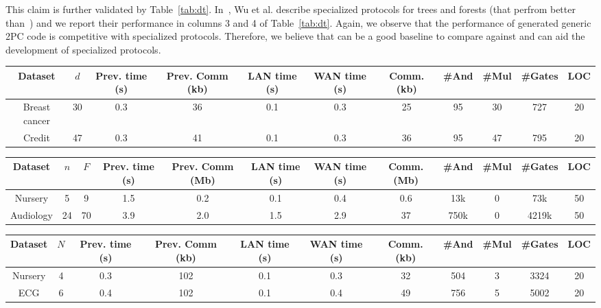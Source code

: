 This claim is further validated by Table~\ref{tab:dt}.
In~\cite{wu}, Wu et al. describe specialized protocols for trees and forests (that perfrom better than~\cite{shafindss}) and we report their performance in columns 3 and 4 of Table~\ref{tab:dt}.
Again, we observe that the performance of \tool generated generic 2PC code is competitive with specialized protocols. Therefore, we believe that \tool can be a good baseline to compare against and can aid the development of specialized protocols.

\begin{table*}[ht]
\begin{tabular}{c|c|c|c|c |c|c|c|c|c|c}
Dataset & $d$  & Prev. time (s) & Prev. Comm (kb) & LAN time (s) & WAN time (s) & Comm. (kb)  & \#And & \#Mul & \#Gates & LOC\\
\hline
Breast cancer & 30 & 0.3 & 36 & 0.1 & 0.3 & 25 & 95 & 30 & 727 & 20\\
\hline
Credit & 47 & 0.3 & 41 & 0.1 & 0.3 & 36 & 95 & 47 & 795 & 20\\
\hline
\end{tabular}

 \caption{Linear classification results}
 \label{tab:lc} 
\end{table*}

\begin{table*}[ht]
\begin{tabular}{c|c|c|c|c|c |c|c|c|c|c|c}
Dataset & $n$ & $F$ & Prev. time (s) & Prev. Comm (Mb) & LAN time (s) & WAN time (s) & Comm. (Mb)  & \#And & \#Mul & \#Gates  & LOC\\
\hline
Nursery & 5 & 9 & 1.5 & 0.2 & 0.1 & 0.4 & 0.6 & 13k & 0 & 73k & 50\\
\hline
Audiology & 24 & 70 & 3.9 & 2.0 & 1.5 & 2.9 & 37 & 750k & 0 & 4219k & 50\\
\hline
\end{tabular}

 \caption{Naive Bayes results}
 \label{tab:nb} 
\end{table*}

\begin{table*}[ht]
\begin{tabular}{c|c|c|c |c|c|c|c|c|c|c}
Dataset  & $N$ & Prev. time (s) & Prev. Comm (kb) & LAN time (s) & WAN time (s) & Comm. (kb)  & \#And & \#Mul & \#Gates & LOC\\
\hline
Nursery & 4 & 0.3 & 102 & 0.1 & 0.3 & 32 & 504 & 3 & 3324 & 20\\
\hline
ECG &  6 & 0.4 & 102 & 0.1 & 0.4 & 49 & 756 & 5 & 5002 & 20\\
\hline
\end{tabular}

 \caption{Decision tree benchmarks}
 \label{tab:dt} 
\end{table*}


